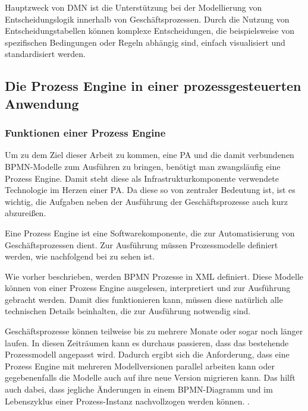 Hauptzweck von \ac{DMN} ist die Unterstützung bei der Modellierung von Entscheidungslogik innerhalb von Geschäftsprozessen. Durch die Nutzung von Entscheidungstabellen können komplexe Entscheidungen, die beispielsweise von spezifischen Bedingungen oder Regeln abhängig sind, einfach visualisiert und standardisiert werden. \citep[vgl.][]{object_management_group_dmn_2025}

\clearpage
\subsection{Die Prozess Engine in einer prozessgesteuerten Anwendung}
\subsubsection{Funktionen einer Prozess Engine}
Um zu dem Ziel dieser Arbeit zu kommen, eine \acl{PA} und die damit verbundenen \ac{BPMN}-Modelle zum Ausführen zu bringen, benötigt man zwangsläufig eine Prozess Engine. Damit steht diese als Infrastrukturkomponente verwendete Technologie im Herzen einer \acl{PA}. Da diese so von zentraler Bedeutung ist, ist es wichtig, die Aufgaben neben der Ausführung der Geschäftsprozesse auch kurz abzureißen. \citep[vgl.][]{stiehl_prozessgesteuerte_2024}

Eine Prozess Engine ist eine Softwarekomponente, die zur Automatisierung von Geschäftsprozessen dient. Zur Ausführung müssen Prozessmodelle definiert werden, wie nachfolgend bei  zu sehen ist. \citep[vgl.][]{leymann_definition_2024}

Wie vorher beschrieben, werden \ac{BPMN} Prozesse in \ac{XML} definiert. Diese Modelle können von einer Prozess Engine ausgelesen, interpretiert und zur Ausführung gebracht werden. Damit dies funktionieren kann, müssen diese natürlich alle technischen Details beinhalten, die zur Ausführung notwendig sind. \citep[vgl.][S. 226]{freund_praxishandbuch_2017}

Geschäftsprozesse können teilweise bis zu mehrere Monate oder sogar noch länger laufen. In diesen Zeiträumen kann es durchaus passieren, dass das bestehende Prozessmodell angepasst wird. Dadurch ergibt sich die Anforderung, dass eine Prozess Engine mit mehreren Modellversionen parallel arbeiten kann oder gegebenenfalls die Modelle auch auf ihre neue Version migrieren kann. Das hilft auch dabei, dass jegliche Änderungen in einem \ac{BPMN}-Diagramm und im Lebenszyklus einer Prozess-Instanz nachvollzogen werden können. \citep[vgl.][S. 226]{freund_praxishandbuch_2017}.

